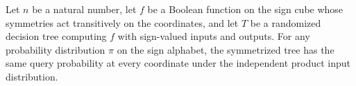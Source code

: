 \begin{theorem}
\label{FABL.RandomizedDecisionTree.symmetrization_hasEqualQueryProbabilities}
\leanok
{}
Let $n$ be a natural number, let $f$ be a Boolean function on the sign cube whose
symmetries act transitively on the coordinates, and let $T$ be a randomized decision
tree computing $f$ with sign-valued inputs and outputs. For any probability distribution
$\pi$ on the sign alphabet, the symmetrized tree has the same query probability at every
coordinate under the independent product input distribution.
\end{theorem}

